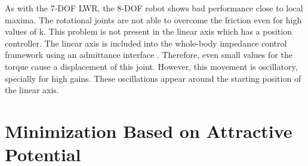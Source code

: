  As with the 7-DOF LWR, the 8-DOF robot shows bad performance close to local maxima. The rotational joints are not able to overcome the friction even for high values of $\mathrm{k}$. This problem is not present in the linear axis which has a position controller. The linear axis is included into the whole-body impedance control framework using an admittance interface \cite{whole_body_imp}. Therefore, even small values for the torque cause a displacement of this joint.
  However, this movement is oscillatory, specially for high gains. These oscillations appear around the starting position of the linear axis.
  






%
%
%














\section{Minimization Based on Attractive Potential}
\label{sec:Minimattractivepotential}




